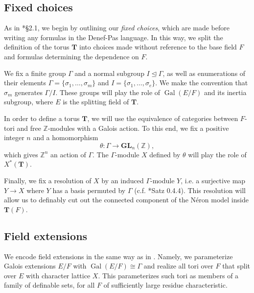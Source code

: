 \documentclass{amsart}
\newcommand{\Z}{{\mathbb Z}}
\newcommand{\GL}{\mathbf {GL}}
\newcommand{\bT}{\mathbf {T}}
\newcommand\spl{\mathrm{spl}}
\DeclareMathOperator{\Gal}{Gal}
\theoremstyle{plain}
\theoremstyle{definition}
\begin{document}
\subsection{Fixed choices}

As in \cite{hales:transfert}*{\S 2.1}, we begin by outlining our \emph{fixed choices}, which are made before writing any formulas in the Denef-Pas language.  
In this way, we split the definition of the torus $\bT$ into choices made without reference to the base field $F$ and formulas determining the dependence on $F$.

We fix a finite group $\Gamma$ and a normal subgroup $I \unlhd \Gamma$, as well as enumerations of their elements $\Gamma = \{\sigma_1, \dots, \sigma_m\}$ and $I = \{\sigma_1, \dots, \sigma_e\}$.  We make the convention that $\sigma_m$ generates $\Gamma / I$.  These groups will play the role of $\Gal(E/F)$ and its inertia subgroup, where $E$ is the splitting field of $\bT$.

In order to define a torus $\bT$, we will use the equivalence of categories between $F$-tori and free $\Z$-modules with a Galois action.  To this end, we fix a positive integer $n$ and a homomorphism
\[
\theta : \Gamma \to \GL_n(\Z),
\]
which gives $\Z^n$ an action of $\Gamma$.  The $\Gamma$-module $X$ defined by $\theta$ will play the role of $X^\ast(\bT)$.

Finally, we fix a resolution of $X$ by an induced $\Gamma$-module $Y$, i.e. a surjective map $Y \to X$ where $Y$ has a basis permuted by $\Gamma$ (c.f. \cite{brahm}*{Satz 0.4.4}).  This resolution will allow us to definably cut out the connected component of the N\'eron model inside $\bT(F)$.



\subsection{Field extensions}
 
We encode field extensions in the same way as in \cite{CGH-2}. Namely, we parameterize Galois extensions $E/F$ with $\Gal(E/F) \cong \Gamma$ and realize all tori over $F$ that split over $E$ with character lattice $X$.  This parameterizes such tori as members of a family of definable sets, for all $F$ of sufficiently large residue characteristic. 
\end{document}
